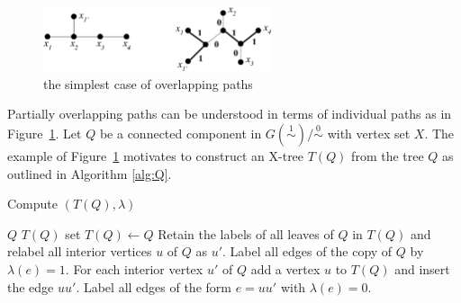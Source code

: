 \documentclass[smallextended]{svjour3}
\newcommand{\Ro}{\mathrel{\overset{0}{\sim}}}
\newcommand{\Rl}{\mathrel{\overset{1}{\sim}}}
\begin{document}
\begin{figure}
\begin{center}
\includegraphics[width=0.6\textwidth]{quintuple2.eps}
\end{center}
\caption{the simplest case of overlapping paths} 
\label{fig:quint2}
\end{figure} 

Partially overlapping paths can be understood in terms of individual paths
as in Figure~\ref{fig:quint2}.  Let $Q$ be a connected component in
$G(\Rl)/\Ro$ with vertex set $X$.  The example of Figure~\ref{fig:quint2}
motivates to construct an X-tree $T(Q)$ from the tree $Q$ as outlined in
Algorithm \ref{alg:Q}.

\begin{algorithm}
\caption{Compute $(T(Q), \lambda)$}
\label{alg:Q}
\begin{algorithmic}[1]
  \REQUIRE $Q$
  \ENSURE $T(Q)$
  \STATE set $T(Q)\leftarrow Q$ 
  \STATE Retain the labels of all leaves of $Q$ in $T(Q)$ and relabel 
			all interior vertices $u$ of $Q$ as $u'$.
  \STATE Label all edges of the copy of $Q$ by $\lambda(e)=1$.
  \STATE For each interior vertex $u'$ of $Q$ add a vertex $u$ to $T(Q)$ and 
		   insert the edge $uu'$. 
  \STATE Label all edges of the form $e=uu'$ with $\lambda(e)=0$. 
\end{algorithmic}
\end{algorithm}
\end{document}
